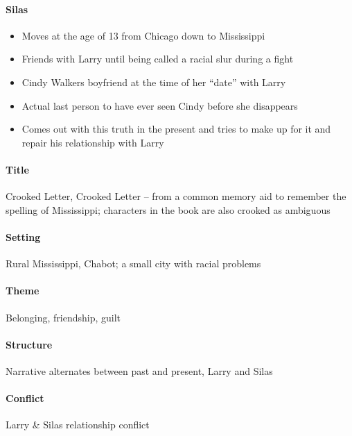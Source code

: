 \documentclass[10pt]{article}
\begin{document}
\paragraph{Silas}
\begin{itemize}
\item Moves at the age of 13 from Chicago down to Mississippi
\item Friends with Larry until being called a racial slur during a fight
\item Cindy Walkers boyfriend at the time of her \enquote{date} with Larry
\item Actual last person to have ever seen Cindy before she disappears
\item Comes out with this truth in the present and tries to make up for it and repair his relationship with Larry
\end{itemize}

\paragraph{Title}
Crooked Letter, Crooked Letter -- from a common memory aid to remember the spelling of Mississippi; characters in the book are also crooked as ambiguous

\paragraph{Setting}
Rural Mississippi, Chabot; a small city with racial problems

\paragraph{Theme}
Belonging, friendship, guilt

\paragraph{Structure}
Narrative alternates between past and present, Larry and Silas

\paragraph{Conflict}
Larry \& Silas relationship conflict

\printntexbibliography
\end{document}
